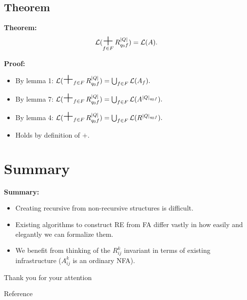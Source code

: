 \documentclass{beamer}
\DeclareMathOperator*{\bigplus}{\mbox{\huge +}}
\begin{document}
\subsection*{Theorem}
\begin{frame}
    \textbf{Theorem:}
    \[
        \mathcal{L}(\bigplus_{f \in F} R^{|Q|}_{q_0 f}) = \mathcal{L}(A).
    \]
    
    \textbf{Proof:}\\
    \begin{itemize}
        \item By lemma 1:
            $\mathcal{L}(\bigplus_{f \in F} R^{|Q|}_{q_0 f}) = \bigcup_{f \in F} \mathcal{L}(A_f).$
        \item By lemma 7:
            $\mathcal{L}(\bigplus_{f \in F} R^{|Q|}_{q_0 f}) = \bigcup_{f \in F} \mathcal{L}(A^{|Q|_{q_0 f}}).$
        \item By lemma 4: 
            $\mathcal{L}(\bigplus_{f \in F} R^{|Q|}_{q_0 f}) = \bigcup_{f \in F} \mathcal{L}(R^{|Q|_{q_0 f}}).$
        \item Holds by definition of $+$.
    \end{itemize}
    
\end{frame}

\section{Summary}
\begin{frame}
    \textbf{Summary:}
    \begin{itemize}
        \item
            Creating recursive from non-recursive structures is difficult.
        \item 
            Existing algorithms to construct RE from FA differ vastly in how easily and elegantly we can formalize them.
        \item
            We benefit from thinking of the $R^k_{i j}$ invariant in terms of existing infrastructure ($A^k_{i j}$ is an ordinary NFA).
    \end{itemize}
\end{frame}

\begin{frame}
    \begin{center}
        \huge Thank you for your attention
    \end{center}
\end{frame}

\begin{frame}[allowframebreaks]{Reference}
    {}
    
\end{frame}
\end{document}
